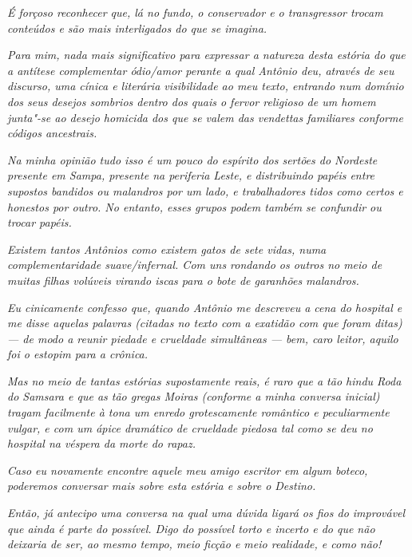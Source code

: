 \emph{É forçoso reconhecer que, lá no fundo, o conservador e o
transgressor trocam conteúdos e são mais interligados do que se
imagina.}

\emph{Para mim, nada mais significativo para expressar a natureza desta
estória do que a antítese complementar ódio/amor perante a qual Antônio
deu, através de seu discurso, uma cínica e literária visibilidade ao meu
texto, entrando num domínio dos seus desejos sombrios dentro dos quais o
fervor religioso de um homem junta"-se ao desejo homicida dos que se
valem das vendettas familiares conforme códigos ancestrais.}~

\emph{Na minha opinião tudo isso é um pouco do espírito dos sertões do
Nordeste presente em Sampa, presente na periferia Leste, e distribuindo
papéis entre supostos bandidos ou malandros por um lado, e trabalhadores
tidos como certos e honestos por outro. No entanto, esses grupos
podem também se confundir ou trocar papéis.}

\emph{Existem tantos Antônios como existem gatos de sete vidas, numa
complementaridade suave/infernal. Com uns rondando os outros no meio de
muitas filhas volúveis virando iscas para o bote de garanhões
malandros.}~

\emph{Eu cinicamente confesso que, quando Antônio me descreveu a cena do
hospital e me disse aquelas palavras (citadas no texto com a exatidão
com que foram ditas) --- de modo a reunir piedade e crueldade
simultâneas --- bem, caro leitor, aquilo foi o estopim para a crônica.}~

\emph{Mas no meio de tantas estórias supostamente reais, é raro que a
tão hindu Roda do Samsara e que as tão gregas Moiras (conforme a minha
conversa inicial) tragam facilmente à tona um enredo grotescamente
romântico e peculiarmente vulgar, e com um ápice dramático de crueldade
piedosa tal como se deu no hospital na véspera da morte do rapaz.}~

\emph{Caso eu novamente encontre aquele meu amigo escritor em algum
boteco, poderemos conversar mais sobre esta estória e sobre o Destino.}~

\emph{Então, já antecipo uma conversa na qual uma dúvida ligará os
fios do improvável que ainda é parte do possível. Digo do possível torto
e incerto e do que não deixaria de ser, ao mesmo tempo, meio ficção e meio
realidade, e como não!~}
